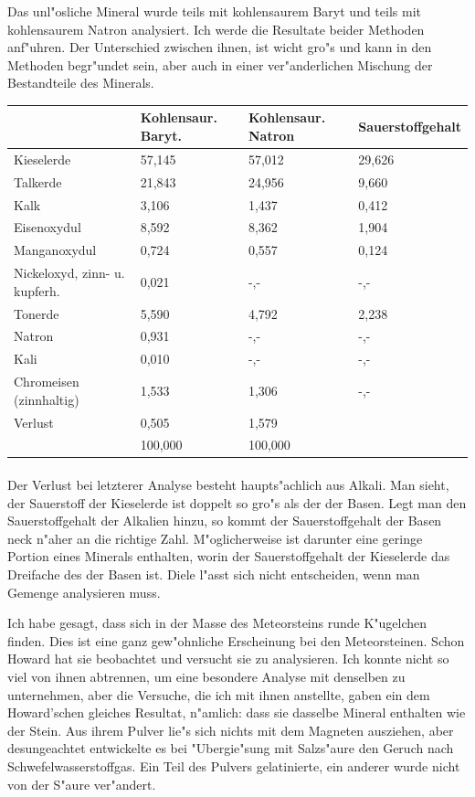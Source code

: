 \documentclass[a4paper, 11pt, oneside]{article}
\begin{document}
Das unl"osliche Mineral wurde teils mit kohlensaurem Baryt und teils mit kohlensaurem Natron analysiert. Ich werde die Resultate beider Methoden anf"uhren. Der Unterschied zwischen ihnen, ist wicht gro"s und kann in den Methoden begr"undet sein, aber auch in einer ver"anderlichen Mischung der Bestandteile des Minerals.
\begin{center}
\begin{tabular}{ |p{30mm}|p{18mm}|p{18mm}|p{24mm}| }
    \hline
      & Kohlensaur. Baryt. & Kohlensaur. Natron & Sauerstoffgehalt\\\hline
    Kieselerde & 57,145 & 57,012 & 29,626\\\hline
    Talkerde & 21,843 & 24,956 & 9,660\\\hline
    Kalk & 3,106 & 1,437 & 0,412\\\hline
    Eisenoxydul & 8,592 & 8,362 & 1,904\\\hline
    Manganoxydul & 0,724 & 0,557  & 0,124\\\hline
    Nickeloxyd, zinn- u. kupferh. & 0,021  & -,-  & -,-\\\hline
    Tonerde & 5,590 & 4,792 & 2,238\\\hline
    Natron & 0,931 & -,- & -,-\\\hline
    Kali & 0,010 & -,-  & -,-\\\hline
    Chromeisen (zinnhaltig) & 1,533 & 1,306 & -,-\\\hline
    Verlust & 0,505 & 1,579 & \\\hline
     & 100,000 & 100,000 & \\
    \hline
\end{tabular}
\end{center}
\paragraph{}
Der Verlust bei letzterer Analyse besteht haupts"achlich aus Alkali. Man sieht, der Sauerstoff der Kieselerde ist doppelt so gro"s als der der Basen. Legt man den Sauerstoffgehalt der Alkalien hinzu, so kommt der Sauerstoffgehalt der Basen neck n"aher an die richtige Zahl. M"oglicherweise ist darunter eine geringe Portion eines Minerals enthalten, worin der Sauerstoffgehalt der Kieselerde das Dreifache des der Basen ist. Diele l"asst sich nicht entscheiden, wenn man Gemenge analysieren muss.

Ich habe gesagt, dass sich in der Masse des Meteorsteins runde K"ugelchen finden. Dies ist eine ganz gew"ohnliche Erscheinung bei den Meteorsteinen. Schon Howard hat sie beobachtet und versucht sie zu analysieren. Ich konnte nicht so viel von ihnen abtrennen, um eine besondere Analyse mit denselben zu unternehmen, aber die Versuche, die ich mit ihnen anstellte, gaben ein dem Howard'schen gleiches Resultat, n"amlich: dass sie dasselbe Mineral enthalten wie der Stein. Aus ihrem Pulver lie"s sich nichts mit dem Magneten ausziehen, aber desungeachtet entwickelte es bei "Ubergie"sung mit Salzs"aure den Geruch nach Schwefelwasserstoffgas. Ein Teil des Pulvers gelatinierte, ein anderer wurde nicht von der S"aure ver"andert.
\end{document}
